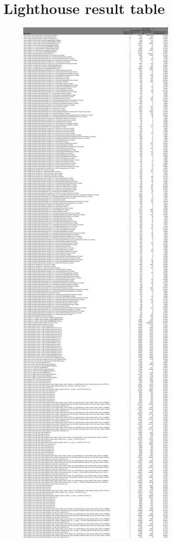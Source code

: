 
\chapter{Lighthouse result table} %

\label{appendix2} %


\begin{figure}[!h]
	\centering
	\begin{adjustbox}{width=\textwidth,totalheight=0.7\textheight}
		\includegraphics[angle=90]{Figures/lighthouse_json_1.pdf}

\end{adjustbox}
\end{figure}
